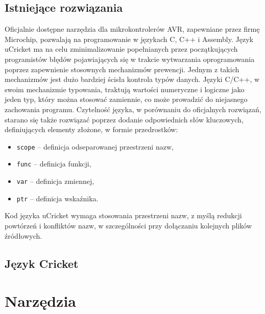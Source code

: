 \subsection{Istniejące rozwiązania}
Oficjalnie dostępne narzędzia dla mikrokontrolerów AVR, zapewniane przez firmę Microchip, pozwalają na programowanie w językach C, C++ i Assembly. Język uCricket ma na celu zminimalizowanie popełnianych przez początkujących programistów błędów pojawiających się w trakcie wytwarzania oprogramowania poprzez zapewnienie stosownych mechanizmów prewencji. Jednym z takich mechanizmów jest dużo bardziej ścisła kontrola typów danych. Języki C/C++, w swoim  mechanizmie typowania, traktują wartości numeryczne i logiczne jako jeden typ, który można stosować zamiennie, co może prowadzić do niejasnego zachowania programu. 
Czytelność języka, w porównaniu do oficjalnych rozwiązań, starano się także rozwiązać poprzez dodanie odpowiednich słów kluczowych, definiujących elementy złożone, w formie przedrostków:
\begin{itemize}
\item \lstinline|scope| -- definicja odseparowanej przestrzeni nazw,
\item \lstinline|func| -- definicja funkcji,
\item \lstinline|var| -- definicja zmiennej,
\item \lstinline|ptr| -- definicja wskaźnika.
\end{itemize}
Kod języka uCricket wymaga stosowania przestrzeni nazw, z myślą redukcji powtórzeń i konfliktów nazw, w szczególności przy dołączaniu kolejnych plików źródłowych.

\subsection{Język \textmu Cricket}





\section{Narzędzia}

